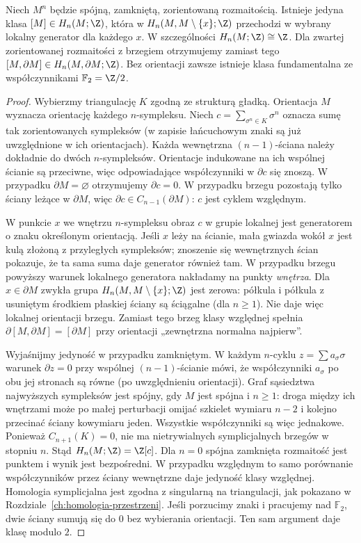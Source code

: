 \begin{twierdzenie}
\label{thm:klasa-fundamentalna-16}
Niech $M^n$ będzie spójną, zamkniętą,
zorientowaną rozmaitością. Istnieje
jedyna klasa
$[M]\in H_n(M;\Z)$, która w
$H_n(M,M\setminus\{x\};\Z)$
przechodzi w wybrany lokalny
generator dla każdego $x$.
W szczególności $H_n(M;\Z)\cong\Z$.
Dla zwartej zorientowanej rozmaitości z brzegiem
otrzymujemy zamiast tego
$[M,\partial M]\in H_n(M,\partial M;\Z)$.
Bez orientacji zawsze istnieje
klasa fundamentalna ze
współczynnikami $\mathbb F_2=\Z/2$.
\end{twierdzenie}
\begin{proof}
Wybierzmy triangulację $K$ zgodną
ze strukturą gładką. Orientacja $M$
wyznacza orientację każdego
$n$-sympleksu. Niech
$c=\sum_{\sigma^n\in K}\sigma^n$
oznacza sumę tak zorientowanych
sympleksów (w zapisie łańcuchowym
znaki są już uwzględnione w ich
orientacjach). Każda wewnętrzna
$(n-1)$-ściana należy dokładnie
do dwóch $n$-sympleksów.
Orientacje indukowane na ich
wspólnej ścianie są przeciwne,
więc odpowiadające współczynniki
w $\partial c$ się znoszą.
W przypadku $\partial M=\varnothing$
otrzymujemy $\partial c=0$.
W przypadku brzegu pozostają tylko
ściany leżące w $\partial M$,
więc $\partial c\in C_{n-1}(\partial M)$:
$c$ jest cyklem względnym.

W punkcie $x$ we wnętrzu
$n$-sympleksu obraz $c$ w
grupie lokalnej jest generatorem
o znaku określonym orientacją.
Jeśli $x$ leży na ścianie,
mała gwiazda wokół $x$ jest
kulą złożoną z przyległych
sympleksów; znoszenie się
wewnętrznych ścian pokazuje,
że ta sama suma daje generator
również tam. W przypadku brzegu powyższy warunek lokalnego
generatora nakładamy na punkty \emph{wnętrza}.
Dla $x\in\partial M$ zwykła grupa
$H_n(M,M\setminus\{x\};\Z)$ jest zerowa:
półkula i półkula z usuniętym środkiem płaskiej ściany
są ściągalne (dla $n\geq1$). Nie daje więc lokalnej
orientacji brzegu. Zamiast tego brzeg klasy względnej
spełnia $\partial[M,\partial M]=[\partial M]$
przy orientacji „zewnętrzna normalna najpierw”.

Wyjaśnijmy jedyność w przypadku
zamkniętym. W każdym $n$-cyklu
$z=\sum a_\sigma\sigma$ warunek
$\partial z=0$ przy wspólnej
$(n-1)$-ścianie mówi, że
współczynniki $a_\sigma$ po obu
jej stronach są równe
(po uwzględnieniu orientacji).
Graf sąsiedztwa najwyższych
sympleksów jest spójny,
gdy $M$ jest spójna i $n\geq1$:
droga między ich wnętrzami
może po małej perturbacji
omijać szkielet wymiaru
$n-2$ i kolejno przecinać
ściany kowymiaru jeden.
Wszystkie współczynniki są
więc jednakowe. Ponieważ
$C_{n+1}(K)=0$, nie ma
nietrywialnych symplicjalnych
brzegów w stopniu $n$.
Stąd $H_n(M;\Z)=\Z[c]$. Dla $n=0$ spójna
zamknięta rozmaitość jest punktem i wynik jest bezpośredni.
W przypadku względnym to samo porównanie współczynników
przez ściany wewnętrzne daje jedyność klasy względnej.
Homologia symplicjalna jest
zgodna z singularną na
triangulacji, jak pokazano
w Rozdziale~\ref{ch:homologia-przestrzeni}.
Jeśli porzucimy znaki i pracujemy
nad $\mathbb F_2$, dwie ściany
sumują się do $0$ bez wybierania
orientacji. Ten sam argument
daje klasę modulo $2$.
\end{proof}

